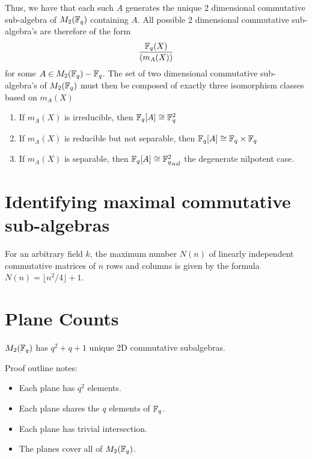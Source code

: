 \documentclass{amsart}
\begin{document}
    Thus, we have that each such $A$ generates the unique 2 dimensional commutative sub-algebra of $M_2(\protect\mathbb{F}_q)$ containing $A$. All possible 2 dimensional commutative sub-algebra's are therefore of the form
    \begin{align*}
        \frac{\protect\mathbb{F}_q(X)}{(m_A(X))}
    \end{align*}
    for some $A \in M_2(\protect\mathbb{F}_q) - \protect\mathbb{F}_q$. The set of two dimensional commutative sub-algebra's of $M_2(\protect\mathbb{F}_q)$ must then be composed of exactly three isomorphism classes based on $m_A(X)$
    \begin{enumerate}
        \item If $m_A(X)$ is irreducible, then $\protect\mathbb{F}_q[A] \cong \protect\mathbb{F}_q^2$
        \item If $m_A(X)$ is reducible but not separable, then $\protect\mathbb{F}_q[A] \cong \protect\mathbb{F}_q \times \protect\mathbb{F}_q$
        \item If $m_A(X)$ is separable, then $\bF_q[A] \cong {\bF_q^2}_{nil}$ the degenerate nilpotent case.
    \end{enumerate}

    

\section{Identifying maximal commutative sub-algebras}

\begin{thm}
    For an arbitrary field $k$, the maximum number $N(n)$ of linearly independent commutative matrices of $n$ rows and columns is given by the formula $N(n) = \lfloor n^2/4 \rfloor + 1$.
\end{thm}

\section{Plane Counts}

\begin{theorem}\label{totalcount}
    $M_2(\protect\mathbb{F}_q)$ has $q^2 + q + 1$ unique 2D commutative subalgebras.
\end{theorem}

Proof outline notes:
\begin{itemize}
    \item Each plane has $q^2$ elements.
    \item Each plane shares the $q$ elements of $\protect\mathbb{F}_q$.
    \item Each plane has trivial intersection.
    \item The planes cover all of $M_2(\protect\mathbb{F}_q)$.
\end{itemize}
\end{document}
